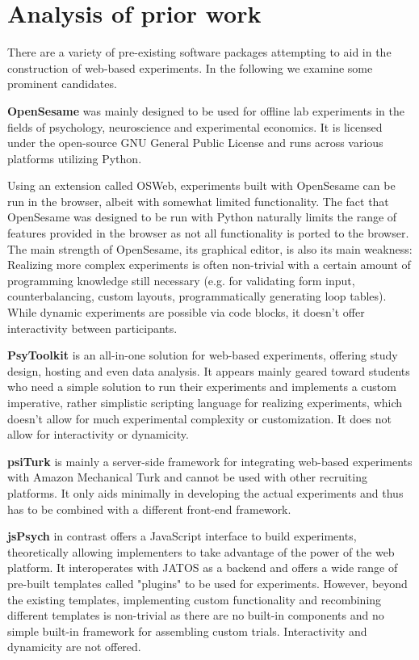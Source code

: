 \documentclass[a4paper,11pt]{scrreprt}
\begin{document}
\chapter{Analysis of prior work}
There are a variety of pre-existing software packages attempting to aid in the construction of web-based experiments. In the following we examine some prominent candidates.

\textbf{OpenSesame} \citep{Mathot2012} was mainly designed to be used for offline lab experiments in the fields of psychology, neuroscience and experimental economics. It is licensed under the open-source GNU General Public License and runs across various platforms utilizing Python.

Using an extension called OSWeb, experiments built with OpenSesame can be run in the browser, albeit with somewhat limited functionality. The fact that OpenSesame was designed to be run with Python naturally limits the range of features provided in the browser as not all functionality is ported to the browser. The main strength of OpenSesame, its graphical editor, is also its main weakness: Realizing more complex experiments is often non-trivial with a certain amount of programming knowledge still necessary (e.g. for validating form input, counterbalancing, custom layouts, programmatically generating loop tables). While dynamic experiments are possible via code blocks, it doesn't offer interactivity between participants.

\textbf{PsyToolkit} \citep{Stoet2012} is an all-in-one solution for web-based experiments, offering study design, hosting and even data analysis. It appears mainly geared toward students who need a simple solution to run their experiments and implements a custom imperative, rather simplistic scripting language for realizing experiments, which doesn't allow for much experimental complexity or customization. It does not allow for interactivity or dynamicity.

\textbf{psiTurk} \citep{Gureckis2016} is mainly a server-side framework for integrating web-based experiments with Amazon Mechanical Turk and cannot be used with other recruiting platforms. It only aids minimally in developing the actual experiments and thus has to be combined with a different front-end framework.

\textbf{jsPsych} \citep{Leeuw2015} in contrast offers a JavaScript interface to build experiments, theoretically allowing implementers to take advantage of the power of the web platform. It interoperates with JATOS \citep{Lange2015} as a backend and offers a wide range of pre-built templates called "plugins" to be used for experiments. However, beyond the existing templates, implementing custom functionality and recombining different templates is non-trivial as there are no built-in components and no simple built-in framework for assembling custom trials. Interactivity and dynamicity are not offered.
\end{document}
